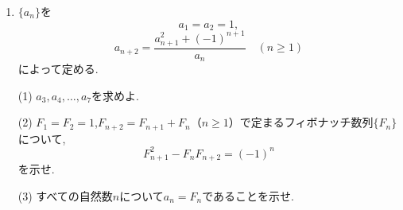\begin{enumerate}[label=\textbf{問\arabic*.},leftmargin=3.8em,format=\bookitemlink{practice-bridge}{problem}{hint}]
    \par\smallskip\noindent
    (3) $0\le x\le1$で$e^x\le e$であることを使って
    \[
      0<I_n\le\frac{e}{n+1}
    \]
    を示し,$\lim_{n\to\infty}I_n$を求めよ.
  \item {}$\{a_n\}$を
    \[
      a_1=a_2=1,
    \]
    \[
      a_{n+2}=\frac{a_{n+1}^2+(-1)^{n+1}}{a_n}
      \quad(n\ge1)
    \]
    によって定める.
    \par\smallskip\noindent
    (1) $a_3,a_4,\ldots,a_7$を求めよ.
    \par\smallskip\noindent
    (2) $F_1=F_2=1$,$F_{n+2}=F_{n+1}+F_n$（$n\ge1$）で定まるフィボナッチ数列$\{F_n\}$について,
    \[
      F_{n+1}^2-F_nF_{n+2}=(-1)^n
    \]
    を示せ.
    \par\smallskip\noindent
    (3) すべての自然数$n$について$a_n=F_n$であることを示せ.
\end{enumerate}


